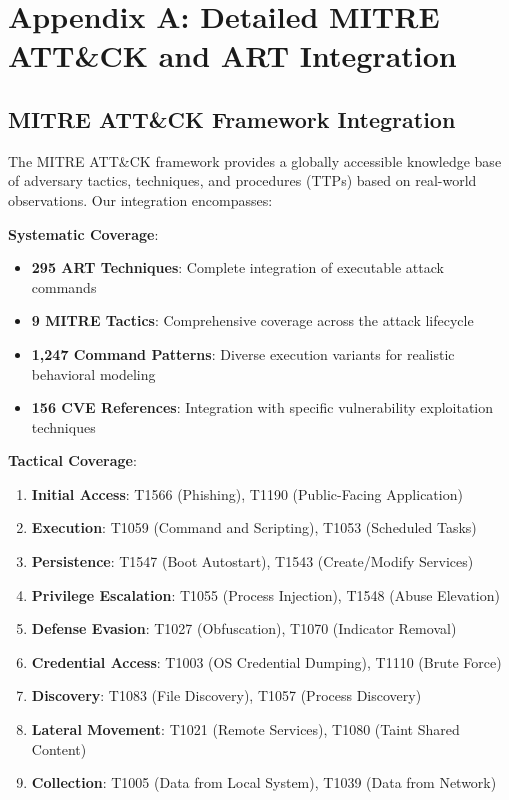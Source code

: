\documentclass[12pt,oneside]{article}
\begin{document}
\clearpage

\section*{Appendix A: Detailed MITRE ATT\&CK and ART Integration}

\subsection*{MITRE ATT\&CK Framework Integration}

The MITRE ATT\&CK framework provides a globally accessible knowledge base of adversary tactics, techniques, and procedures (TTPs) based on real-world observations. Our integration encompasses:

\textbf{Systematic Coverage}:
\begin{itemize}
    \item \textbf{295 ART Techniques}: Complete integration of executable attack commands
    \item \textbf{9 MITRE Tactics}: Comprehensive coverage across the attack lifecycle
    \item \textbf{1,247 Command Patterns}: Diverse execution variants for realistic behavioral modeling
    \item \textbf{156 CVE References}: Integration with specific vulnerability exploitation techniques
\end{itemize}

\textbf{Tactical Coverage}:
\begin{enumerate}
    \item \textbf{Initial Access}: T1566 (Phishing), T1190 (Public-Facing Application)
    \item \textbf{Execution}: T1059 (Command and Scripting), T1053 (Scheduled Tasks)
    \item \textbf{Persistence}: T1547 (Boot Autostart), T1543 (Create/Modify Services)
    \item \textbf{Privilege Escalation}: T1055 (Process Injection), T1548 (Abuse Elevation)
    \item \textbf{Defense Evasion}: T1027 (Obfuscation), T1070 (Indicator Removal)
    \item \textbf{Credential Access}: T1003 (OS Credential Dumping), T1110 (Brute Force)
    \item \textbf{Discovery}: T1083 (File Discovery), T1057 (Process Discovery)
    \item \textbf{Lateral Movement}: T1021 (Remote Services), T1080 (Taint Shared Content)
    \item \textbf{Collection}: T1005 (Data from Local System), T1039 (Data from Network)
\end{enumerate}
\end{document}
